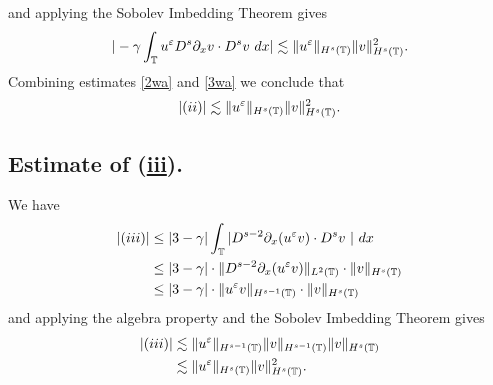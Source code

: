 	and applying the Sobolev Imbedding Theorem gives
	\begin{equation}
		\begin{split}
			| - \gamma \int_{\mathbb{T}} u^\varepsilon D^s \partial_x v \cdot D^s v \ dx |
			\lesssim \|u^\varepsilon \|_{H^s(\mathbb{T})} \|v\|_{H^s(\mathbb{T})}^2.
			\label{3wa}
		\end{split}
	\end{equation}
	Combining estimates \eqref{2wa} and \eqref{3wa} we conclude that
	\begin{equation}
		\begin{split}
			|(ii)| \lesssim \|u^\varepsilon \|_{H^s(\mathbb{T})} \|v\|_{H^s(\mathbb{T})}^2.
			\label{4wa}
		\end{split}
	\end{equation}
\subsection{ Estimate of (\hyperref[8u]{iii}).} We have
	\begin{equation}
		\begin{split}
			|(iii)|
			& \le |3-\gamma| \int_{\mathbb{T}} |D^{s-2} \partial_x (u^\varepsilon v) \cdot D^s v
			\ | \ dx
			\\
			& \le |3- \gamma| \cdot  \|D^{s-2}\partial_x (u^\varepsilon v)
			\|_{L^2(\mathbb{T})} \cdot \|v\|_{H^s(\mathbb{T})}
			\\
			& \le |3- \gamma| \cdot  \| u^\varepsilon v \|_{H^{s -1}(\mathbb{T})} \cdot \|v\|_{H^s(\mathbb{T})}
			\label{12u}
		\end{split}
	\end{equation}
	and applying the algebra property and the Sobolev Imbedding Theorem gives
	\begin{equation}
		\begin{split}
			|(iii)| & \lesssim \|u^\varepsilon\|_{H^{s-1}(\mathbb{T})} \|v\|_{H^{s-1}(\mathbb{T})}
			\|v\|_{H^s(\mathbb{T})}
			\\
			& \lesssim \|u^\varepsilon\|_{H^{s}(\mathbb{T})} \|v\|_{H^{s}(\mathbb{T})}^2.
			\label{13u}
		\end{split}
	\end{equation}
